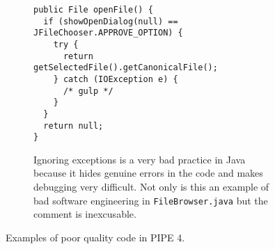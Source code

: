 \begin{figure}[tb]
\begin{center}
\ContinuedFloat



    \begin{subfigure}[b]{\linewidth}
    \vspace{0.5cm}
    \begin{lstlisting}[frame=single]
public File openFile() {
  if (showOpenDialog(null) == JFileChooser.APPROVE_OPTION) {
    try {
      return getSelectedFile().getCanonicalFile();
    } catch (IOException e) {
      /* gulp */
    }
  }
  return null;
}
    \end{lstlisting}
    \caption{Ignoring exceptions is a very bad practice in Java because it hides genuine errors in the code and makes debugging very difficult. Not only is this an example of bad software engineering in \texttt{FileBrowser.java} but the comment is inexcusable.}
  \end{subfigure}
\caption{Examples of poor quality code in PIPE 4.}
\label{lst:identical}
\end{center}
\end{figure}